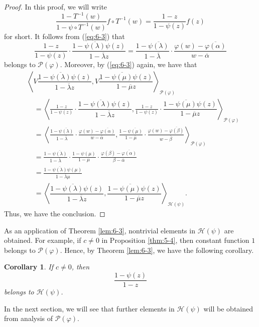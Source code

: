 \documentclass[12pt]{article}
\newtheorem{cor}[thm]{Corollary}
\numberwithin{equation}{section}
\newcommand{\cP}{{\mathcal P}}
\newcommand{\cH}{{\mathcal H}}
\newcommand{\la}{\langle}
\newcommand{\ra}{\rangle}
\newcommand{\lam}{\lambda}
\begin{document}
\begin{proof}
In this proof, we will write
\[
\frac{1-T^{-1}(w)}{1-\psi\circ T^{-1}(w)}f\circ T^{-1}(w)=
\frac{1-z}{1-\psi(z)}f(z)
\]
for short. 
It follows from (\ref{eq:6-3}) that 
\[
\frac{1-z}{1-\psi(z)}\cdot \dfrac{1-\overline{\psi(\lam)}\psi(z)}{1-\overline{\lam}z}
=\frac{1-\overline{\psi(\lam)}}{1-\overline{\lam}}
\cdot\frac{\varphi(w)-\overline{\varphi(\alpha)}}{w-\overline{\alpha}}
\]
belongs to $\cP(\varphi)$. 
Moreover, by (\ref{eq:6-3}) again, we have that
\begin{align*}
&\left\la V\dfrac{1-\overline{\psi(\lam)}\psi(z)}{1-\overline{\lam}z}, 
V\dfrac{1-\overline{\psi(\mu)}\psi(z)}{1-\overline{\mu}z} \right\ra_{\cP(\varphi)}\\
&\quad=\left\la \frac{1-z}{1-\psi(z)}\cdot \dfrac{1-\overline{\psi(\lam)}\psi(z)}{1-\overline{\lam}z}, 
\frac{1-z}{1-\psi(z)}\cdot\dfrac{1-\overline{\psi(\mu)}\psi(z)}{1-\overline{\mu}z} \right\ra_{\cP(\varphi)}\\
&\quad=\left\la\frac{1-\overline{\psi(\lam)}}{1-\overline{\lam}}
\cdot\frac{\varphi(w)-\overline{\varphi(\alpha)}}{w-\overline{\alpha}},
\frac{1-\overline{\psi(\mu)}}{1-\overline{\mu}}\cdot \frac{\varphi(w)-\overline{\varphi(\beta)}}{w-\overline{\beta}}\right\ra_{\cP(\varphi)}\\
&\quad= \frac{1-\overline{\psi(\lam)}}{1-\overline{\lam}}\cdot \frac{1-\psi(\mu)}{1-\mu}
\cdot\frac{\varphi(\beta)-\overline{\varphi(\alpha)}}{\beta-\overline{\alpha}}\\
&\quad=\frac{1-\overline{\psi(\lam)}\psi(\mu)}{1-\overline{\lam}\mu}\\
&\quad=\left\la \dfrac{1-\overline{\psi(\lam)}\psi(z)}{1-\overline{\lam}z}, 
\dfrac{1-\overline{\psi(\mu)}\psi(z)}{1-\overline{\mu}z} \right\ra_{\cH(\psi)}.
\end{align*}
Thus, we have the conclusion.
\end{proof}

As an application of Theorem \ref{lem:6-3}, 
nontrivial elements in $\cH(\psi)$ are obtained. 
For example, if $c\neq 0$ in Proposition \ref{thm:5-4}, 
then constant function $1$ belongs to $\cP(\varphi)$. 
Hence, by Theorem \ref{lem:6-3}, we have the following corollary.
\begin{cor}\label{cor:5-5}
If $c\neq 0$, then
\[
\frac{1-\psi(z)}{1-z}
\]
belongs to $\cH(\psi)$.
\end{cor}
In the next section, we will see that 
further elements in $\cH(\psi)$ will be obtained from analysis of $\cP(\varphi)$. 
\end{document}
